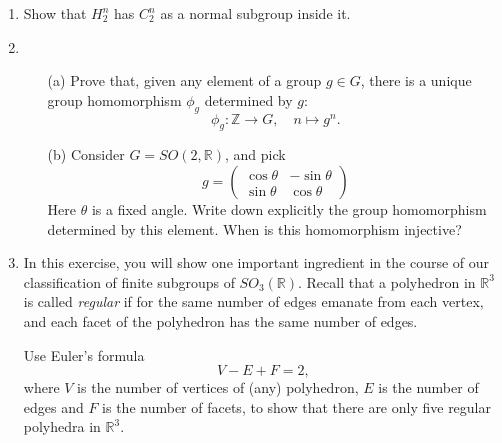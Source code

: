 \documentclass[12pt]{article}
\theoremstyle{plain}
\theoremstyle{definition}
\theoremstyle{remark}
\newcommand{\Z}{\mathbb{Z}}
\newcommand{\R}{\mathbb{R}}
\newcommand{\lra}{\longrightarrow}
\begin{document}
\begin{enumerate}
\item Show that $H_2^n$ has $C_2^n$ as a normal subgroup inside it.

\item
\begin{enumerate}
\item[(a)] Prove that, given any element of a group $g\in G$, there is a unique group homomorphism $\phi_g$ determined by $g$:
\[
\phi_g: \Z\lra G,\quad n\mapsto g^n.
\]
\item[(b)] Consider $G=SO(2,\mathbb{R})$, and pick 
    $$g=
    \left(
    \begin{array}{cc}
    \cos \theta &-\sin \theta\\
    \sin \theta & \cos \theta
    \end{array}
    \right)
    $$
   Here $\theta$ is a fixed angle. Write down explicitly the group homomorphism determined by this element. When is this homomorphism injective?
\end{enumerate}

\item In this exercise, you will show one important ingredient in the course of our classification of finite subgroups of $SO_3(\R)$. Recall that a polyhedron in $\R^3$ is called \emph{regular} if for the same number of edges emanate from each vertex, and each facet of the polyhedron has the same number of edges. 

Use Euler's formula 
\[
V-E+F=2,
\]
where $V$ is the number of vertices of (any) polyhedron, $E$ is the number of edges and $F$ is the number of facets, to show that there are only five regular polyhedra in $\R^3$.
\end{enumerate}
\end{document}
